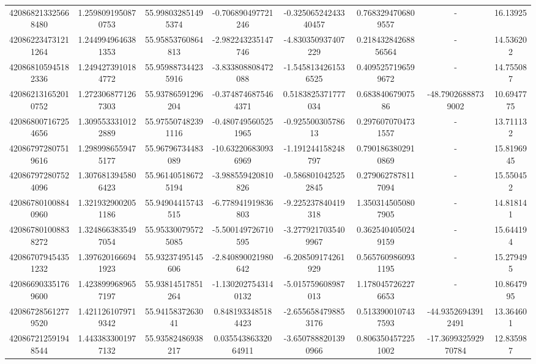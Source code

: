 \documentclass{article}
\begin{document}
\begin{landscape}
\begin{longtable}[c]{S[table-format=18.0]S[table-format=2.15]S[table-format=2.15]S[table-format=-2.17]S[table-format=-2.16]S[table-format=-2.16]S[table-format=-3.16]S[table-format=2.7]}
420868213325668480 & 1.2598091950870753 & 55.998032851495374 & -0.706890497721246   & -0.32506524243340457   & 0.7683294706809557  & {-}                  & 16.13925   \\
420862234731211264 & 1.2449949646381353 & 55.95853760864813  & -2.982243235147746   & -4.830350937407229     & 0.21843284268856564 & {-}                  & 14.536202  \\
420868105945182336 & 1.2494273910184772 & 55.959887344235916 & -3.833808808472088   & -1.5458134261536525    & 0.4095257196599672  & {-}                  & 14.755087  \\
420862131652010752 & 1.2723068771267303 & 55.93786591296204  & -0.3748746875464371  & 0.5183825371777034     & 0.68384067907586    & -48.79026888739002  & 10.6947775 \\
420868007167254656 & 1.3095533310122889 & 55.975507482391116 & -0.4807495605251965  & -0.92550030578613      & 0.2976070704731557  & {-}                  & 13.711132  \\
420867972807519616 & 1.2989986559475177 & 55.96796734483089  & -10.632206830936969  & -1.191244158248797     & 0.7901863802910869  & {-}                  & 15.8196945 \\
420867972807524096 & 1.3076813945806423 & 55.961405186725194 & -3.988559420810826   & -0.5868010425252845    & 0.2790627878117094  & {-}                  & 15.550452  \\
420867801008840960 & 1.3219329002051186 & 55.94904415743515  & -6.778941919836803   & -9.225237840419318     & 1.3503145050807905  & {-}                  & 14.818141  \\
420867801008838272 & 1.3248663835497054 & 55.953300795725085 & -5.500149726710595   & -3.2779217035409967    & 0.3625404050249159  & {-}                  & 15.644194  \\
420867079454351232 & 1.3976201666941923 & 55.93237495145606  & -2.840890021980642   & -6.208509174261929     & 0.5657609860931195  & {-}                  & 15.279495  \\
420866903351769600 & 1.4238999689657197 & 55.93814517851264  & -1.1302027543140132  & -5.015759608987013     & 1.1780457262276653  & {-}                  & 10.8647995 \\
420867285612779520 & 1.4211261079719342 & 55.9415837263041   & 0.8481933485184423   & -2.6556584798853176    & 0.5133900107437593  & -44.93526943912491  & 13.364601  \\
420867212591948544 & 1.4433833001977132 & 55.93582486938217  & 0.03554386332064911  & -3.6507888201390966    & 0.8063504572251002  & -17.369932592970784 & 12.835987  \\

\end{longtable}
\end{landscape}
\end{document}
